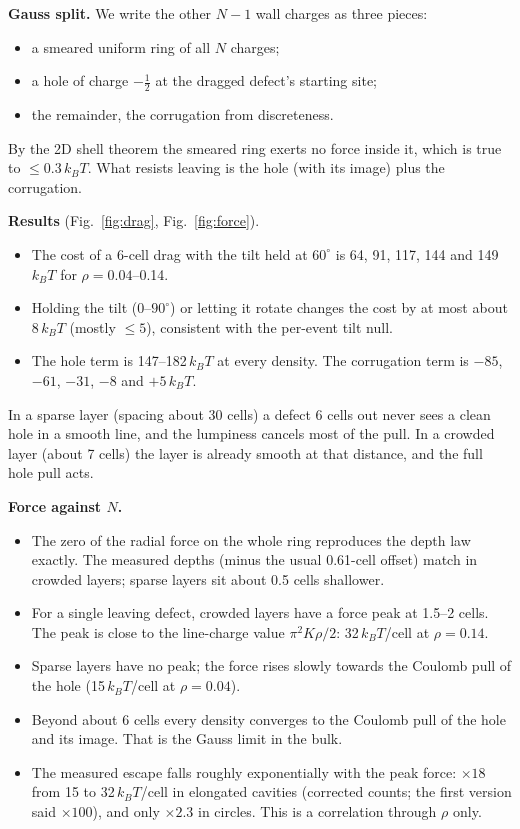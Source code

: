 \documentclass[11pt,a4paper]{article}
\newcommand{\half}{\tfrac12}
\newcommand{\kT}{k_BT}
\begin{document}
\textbf{Gauss split.} We write the other $N-1$ wall charges as three pieces:
\begin{itemize}
\item a smeared uniform ring of all $N$ charges;
\item a hole of charge $-\half$ at the dragged defect's starting site;
\item the remainder, the corrugation from discreteness.
\end{itemize}
By the 2D shell theorem the smeared ring exerts no force inside it, which is true to $\leq0.3\,\kT$. What resists leaving is the hole (with its image)
plus the corrugation.

\textbf{Results} (Fig.~\ref{fig:drag}, Fig.~\ref{fig:force}).
\begin{itemize}
\item The cost of a 6-cell drag with the tilt held at $60^\circ$ is 64, 91, 117, 144 and 149\,$\kT$ for $\rho=0.04$--0.14.
\item Holding the tilt (0--$90^\circ$) or letting it rotate changes the cost by at most about $8\,\kT$ (mostly $\leq5$), consistent with the per-event tilt null.
\item The hole term is 147--182\,$\kT$ at every density. The corrugation term is $-85$, $-61$, $-31$, $-8$ and $+5\,\kT$.
\end{itemize}
In a sparse layer (spacing about 30 cells) a defect 6 cells out never sees a clean hole in a smooth line, and the lumpiness cancels most of the
pull. In a crowded layer (about 7 cells) the layer is already smooth at that distance, and the full hole pull acts.

\textbf{Force against $N$.}
\begin{itemize}
\item The zero of the radial force on the whole ring reproduces the depth law exactly. The measured depths (minus the usual 0.61-cell offset) match in crowded layers; sparse layers sit about 0.5 cells shallower.
\item For a single leaving defect, crowded layers have a force peak at 1.5--2 cells. The peak is close to the line-charge value $\pi^2K\rho/2$: 32\,$\kT$/cell at $\rho=0.14$.
\item Sparse layers have no peak; the force rises slowly towards the Coulomb pull of the hole (15\,$\kT$/cell at $\rho=0.04$).
\item Beyond about 6 cells every density converges to the Coulomb pull of the hole and its image. That is the Gauss limit in the bulk.
\item The measured escape falls roughly exponentially with the peak force: $\times18$ from 15 to 32\,$\kT$/cell in elongated cavities (corrected counts; the first version said $\times100$), and only $\times2.3$ in circles. This is a correlation through $\rho$ only.
\end{itemize}
\end{document}
